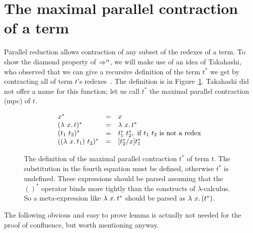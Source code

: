 \section{The maximal parallel contraction of a term}

Parallel reduction allows contraction of any subset of the redexes of
a term.  To show the diamond property of $\Rightarrow^\alpha$, we will make
use of an idea of Takahashi, who observed that we can give a recursive
definition of the term $t^*$ we get by contracting all of term $t$'s redexes~\cite{takahashi95}.
The definition is in Figure~\ref{fig:mpc}.  Takahashi did not offer a name
for this function; let us call $t^*$ the maximal parallel contraction (mpc) of $t$.

\begin{figure}
\[
\begin{array}{lll}
x^* & = & x \\
(\lambda\ x.\, t)^* & = & \lambda\ x.\, t^* \\
(t_1\ t_2)^* & = & t_1^*\ t_2^*,\textnormal{ if } t_1\ t_2\textnormal{ is not a redex} \\
((\lambda\ x.\, t_1)\ t_2)^* & = &  [t_2^*/x]t_1^* 
\end{array}
\]
\caption{The definition of the maximal parallel contraction $t^*$ of term $t$.  The substitution in the fourth
  equation must be defined, otherwise $t^*$ is undefined.   These expressions
  should be parsed assuming that the $()^*$ operator binds more tightly than the constructs of $\lambda$-calculus. So a meta-expression
like $\lambda\ x.\, t^*$ should be parsed as $\lambda\ x.\, (t^*)$.}
\label{fig:mpc}
\end{figure}

The following obvious and easy to prove lemma is actually not needed for the proof of confluence,
but worth mentioning anyway.

